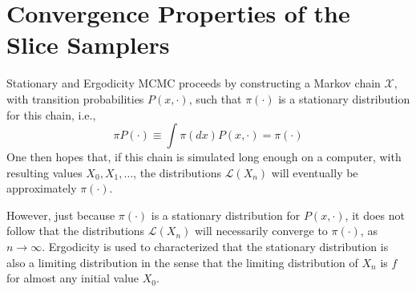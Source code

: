 \documentclass{beamer}
\begin{document}
\section{Convergence Properties of the Slice Samplers}
\begin{frame}{Stationary and Ergodicity}
	MCMC proceeds by constructing a Markov chain $\mathcal{X}$, with transition probabilities $P(x, \cdot)$, such that $\pi(\cdot)$ is a stationary distribution for this chain, i.e.,
	$$
	\pi P(\cdot) \equiv \int \pi(d x) P(x, \cdot)=\pi(\cdot)
	$$
	One then hopes that, if this chain is simulated long enough on a computer, with resulting values $X_{0}, X_{1}, \ldots$, the distributions $\mathcal{L}\left(X_{n}\right)$ will eventually be approximately $\pi(\cdot)$.
	
	However, just because $\pi(\cdot)$ is a stationary distribution for $P(x, \cdot)$, it does not follow that the distributions $\mathcal{L}\left(X_{n}\right)$ will necessarily converge to $\pi(\cdot)$, as $n \rightarrow \infty$. Ergodicity is used to characterized that the stationary distribution is also a limiting distribution in the sense that the limiting distribution of $X_n$ is $f$ for almost any initial value $X_0$.
\end{frame}
\end{document}
